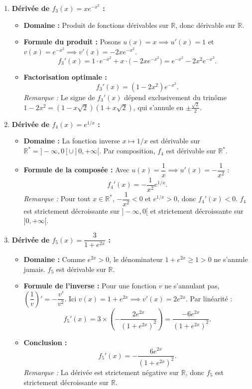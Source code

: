 \documentclass[11pt,a4paper]{article}
\newcommand{\R}{\mathbb{R}}
\begin{document}
\begin{correctionbox}[Exercice 4]
\begin{enumerate}[label=\textbf{\arabic*.}]
    \item \textbf{Dérivée de $f_3(x) = x e^{-x^2}$ :}
    \begin{itemize}
        \item \textbf{Domaine :} Produit de fonctions dérivables sur $\R$, donc dérivable sur $\R$.
        \item \textbf{Formule du produit :} Posons $u(x) = x \implies u'(x) = 1$ et $v(x) = e^{-x^2} \implies v'(x) = -2x e^{-x^2}$.
        \[
        f_3'(x) = 1 \cdot e^{-x^2} + x \cdot \bigl(-2x e^{-x^2}\bigr) = e^{-x^2} - 2x^2 e^{-x^2}.
        \]
        \item \textbf{Factorisation optimale :}
        \[
        \boxed{f_3'(x) = (1 - 2x^2) e^{-x^2}}.
        \]
        \textit{Remarque :} Le signe de $f_3'(x)$ dépend exclusivement du trinôme $1 - 2x^2 = (1 - x\sqrt{2})(1 + x\sqrt{2})$, qui s'annule en $\pm \frac{\sqrt{2}}{2}$.
    \end{itemize}

    \item \textbf{Dérivée de $f_4(x) = e^{1/x}$ :}
    \begin{itemize}
        \item \textbf{Domaine :} La fonction inverse $x \mapsto 1/x$ est dérivable sur $\R^* = ]-\infty, 0[ \cup ]0, +\infty[$. Par composition, $f_4$ est dérivable sur $\R^*$.
        \item \textbf{Formule de la composée :} Avec $u(x) = \dfrac{1}{x} \implies u'(x) = -\dfrac{1}{x^2}$ :
        \[
        \boxed{f_4'(x) = -\frac{1}{x^2} e^{1/x}}.
        \]
        \textit{Remarque :} Pour tout $x \in \R^*$, $-\dfrac{1}{x^2} < 0$ et $e^{1/x} > 0$, donc $f_4'(x) < 0$. $f_4$ est strictement décroissante sur $]-\infty, 0[$ et strictement décroissante sur $]0, +\infty[$.
    \end{itemize}

    \item \textbf{Dérivée de $f_5(x) = \dfrac{3}{1 + e^{2x}}$ :}
    \begin{itemize}
        \item \textbf{Domaine :} Comme $e^{2x} > 0$, le dénominateur $1 + e^{2x} \ge 1 > 0$ ne s'annule jamais. $f_5$ est dérivable sur $\R$.
        \item \textbf{Formule de l'inverse :} Pour une fonction $v$ ne s'annulant pas, $\left(\dfrac{1}{v}\right)' = -\dfrac{v'}{v^2}$.
        Ici $v(x) = 1 + e^{2x} \implies v'(x) = 2e^{2x}$. Par linéarité :
        \[
        f_5'(x) = 3 \times \left( -\frac{2e^{2x}}{(1 + e^{2x})^2} \right) = \frac{-6e^{2x}}{(1 + e^{2x})^2}.
        \]
        \item \textbf{Conclusion :}
        \[
        \boxed{f_5'(x) = -\frac{6e^{2x}}{(1 + e^{2x})^2}}.
        \]
        \textit{Remarque :} La dérivée est strictement négative sur $\R$, donc $f_5$ est strictement décroissante sur $\R$.
    \end{itemize}


\end{enumerate}
\end{correctionbox}
\end{document}
